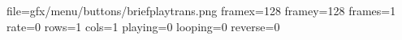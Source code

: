 file=gfx/menu/buttons/briefplaytrans.png
framex=128
framey=128
frames=1
rate=0
rows=1
cols=1
playing=0
looping=0
reverse=0